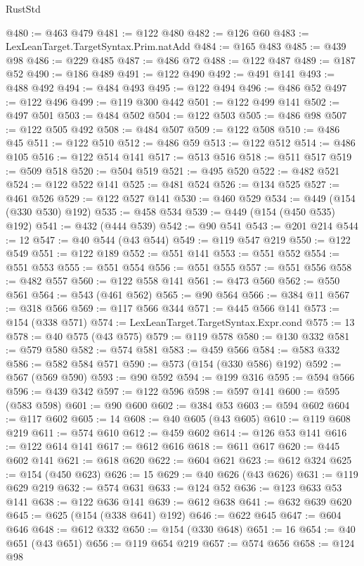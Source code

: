 \begin{lexlean}{RustStd}
\begin{coremodule}
@480 := @463 @479
@481 := @122 @480
@482 := @126 @60
@483 := LexLeanTarget.TargetSyntax.Prim.natAdd
@484 := @165 @483
@485 := @439 @98
@486 := @229 @485
@487 := @486 @72
@488 := @122 @487
@489 := @187 @52
@490 := @186 @489
@491 := @122 @490
@492 := @491 @141
@493 := @488 @492
@494 := @484 @493
@495 := @122 @494
@496 := @486 @52
@497 := @122 @496
@499 := @119 @300 @442
@501 := @122 @499 @141
@502 := @497 @501
@503 := @484 @502
@504 := @122 @503
@505 := @486 @98
@507 := @122 @505 @492
@508 := @484 @507
@509 := @122 @508
@510 := @486 @45
@511 := @122 @510
@512 := @486 @59
@513 := @122 @512
@514 := @486 @105
@516 := @122 @514 @141
@517 := @513 @516
@518 := @511 @517
@519 := @509 @518
@520 := @504 @519
@521 := @495 @520
@522 := @482 @521
@524 := @122 @522 @141
@525 := @481 @524
@526 := @134 @525
@527 := @461 @526
@529 := @122 @527 @141
@530 := @460 @529
@534 := @449 (@154 (@330 @530) @192)
@535 := @458 @534
@539 := @449 (@154 (@450 @535) @192)
@541 := @432 (@444 @539)
@542 := @90 @541
@543 := @201 @214
@544 := 12
@547 := @40 @544 (@43 @544)
@549 := @119 @547 @219
@550 := @122 @549
@551 := @122 @189
@552 := @551 @141
@553 := @551 @552
@554 := @551 @553
@555 := @551 @554
@556 := @551 @555
@557 := @551 @556
@558 := @482 @557
@560 := @122 @558 @141
@561 := @473 @560
@562 := @550 @561
@564 := @543 (@461 @562)
@565 := @90 @564
@566 := @384 @11
@567 := @318 @566
@569 := @117 @566 @344
@571 := @445 @566 @141
@573 := @154 (@338 @571)
@574 := LexLeanTarget.TargetSyntax.Expr.cond
@575 := 13
@578 := @40 @575 (@43 @575)
@579 := @119 @578
@580 := @130 @332
@581 := @579 @580
@582 := @574 @581
@583 := @459 @566
@584 := @583 @332
@586 := @582 @584 @571
@590 := @573 (@154 (@330 @586) @192)
@592 := @567 (@569 @590)
@593 := @90 @592
@594 := @199 @316
@595 := @594 @566
@596 := @439 @342
@597 := @122 @596
@598 := @597 @141
@600 := @595 (@583 @598)
@601 := @90 @600
@602 := @384 @53
@603 := @594 @602
@604 := @117 @602
@605 := 14
@608 := @40 @605 (@43 @605)
@610 := @119 @608 @219
@611 := @574 @610
@612 := @459 @602
@614 := @126 @53 @141
@616 := @122 @614 @141
@617 := @612 @616
@618 := @611 @617
@620 := @445 @602 @141
@621 := @618 @620
@622 := @604 @621
@623 := @612 @324
@625 := @154 (@450 @623)
@626 := 15
@629 := @40 @626 (@43 @626)
@631 := @119 @629 @219
@632 := @574 @631
@633 := @124 @52
@636 := @123 @633 @53 @141
@638 := @122 @636 @141
@639 := @612 @638
@641 := @632 @639 @620
@645 := @625 (@154 (@338 @641) @192)
@646 := @622 @645
@647 := @604 @646
@648 := @612 @332
@650 := @154 (@330 @648)
@651 := 16
@654 := @40 @651 (@43 @651)
@656 := @119 @654 @219
@657 := @574 @656
@658 := @124 @98

\end{coremodule}
\end{lexlean}
